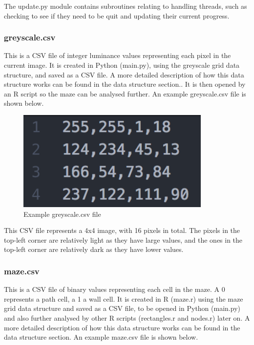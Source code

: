 \documentclass[titlepage]{article}
\begin{document}
The update.py module contains subroutines relating to handling threads, such as checking to see if they need to be quit and updating their current progress.\\

\subsubsection{greyscale.csv}
This is a CSV file of integer luminance values representing each pixel in the current image. It is created in Python (main.py), using the greyscale grid data structure, and saved as a CSV file. A more detailed description of how this data structure works can be found in the data structure section.. It is then opened by an R script so the maze can be analysed further. An example greyscale.csv file is shown below. 

\begin{figure}[H]
  \centering
  \includegraphics[height=5cm]{grayay.png}
  \caption{Example greyscale.csv file}
  \label{fig:dijk}
\end{figure}

This CSV file represents a 4x4 image, with 16 pixels in total. The pixels in the top-left corner are relatively light as they have large values, and the ones in the top-left corner are relatively dark as they have lower values. 

\subsubsection{maze.csv}
This is a CSV file of binary values representing each cell in the maze. A 0 represents a path cell, a 1 a wall cell. It is created in R (maze.r) using the maze grid data structure and saved as a CSV file, to be opened in Python (main.py) and also further analysed by other R scripts (rectangles.r and nodes.r) later on. A more detailed description of how this data structure works can be found in the data structure section. An example maze.csv file is shown below. 
\end{document}
